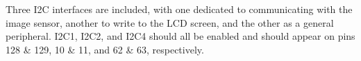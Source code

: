 Three I2C interfaces are included, with one dedicated to communicating with the image sensor, another to write to the LCD screen, and the other as a general peripheral.
I2C1, I2C2, and I2C4 should all be enabled and should appear on pins 128 \& 129, 10 \& 11, and 62 \& 63, respectively.